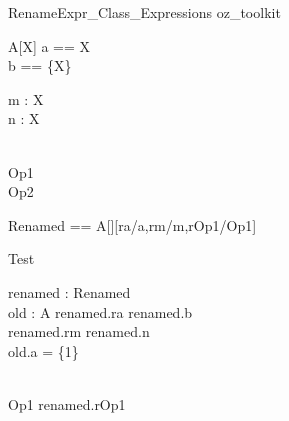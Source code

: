 \begin{zsection}
  \SECTION RenameExpr\_Class\_Expressions \parents oz\_toolkit
\end{zsection}

\begin{class}{A[X]}
  a == X\\
  b == \{X\}\\
  \begin{state}
    m : X\\
    n : \power X
  \end{state}\\
  Op1 \sdef [x? : X]\\
  Op2 \sdef [y? : \power X]
\end{class}

\begin{zed}
  Renamed == A[\nat][ra/a,rm/m,rOp1/Op1]
\end{zed}

\begin{class}{Test}
  \begin{state}
     renamed : Renamed\\
     old : A
  \where
     renamed.ra \in renamed.b\\
     renamed.rm \in renamed.n\\
     old.a = \{1\}
  \end{state}\\
  Op1 \sdef renamed.rOp1
\end{class}
